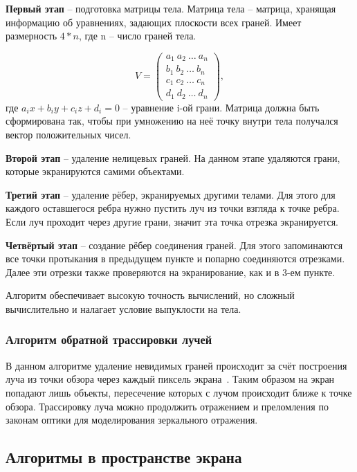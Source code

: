\textbf{Первый этап} -- подготовка матрицы тела. Матрица тела -- матрица, хранящая информацию об уравнениях, задающих плоскости всех граней. Имеет размерность $4*n$, где n -- число граней тела.

\begin{equation}
	\label{eq:body_matrix}
	V = \begin{pmatrix}
		a_1\ a_2\ \dots\ a_n \\
		b_1\ b_2\ \dots\ b_n \\
		c_1\ c_2\ \dots\ c_n \\
		d_1\ d_2\ \dots\ d_n 
	\end{pmatrix},
\end{equation}
где $ a_ix + b_iy + c_iz + d_i = 0 $ -- уравнение i-ой грани. Матрица должна быть сформирована так, чтобы при умножению на неё точку внутри тела получался вектор положительных чисел.

\textbf{Второй этап} -- удаление нелицевых граней. На данном этапе удаляются грани, которые экранируются самими объектами.

\textbf{Третий этап} -- удаление рёбер, экранируемых другими телами. Для этого для каждого оставшегося ребра нужно пустить луч из точки взгляда к точке ребра. Если луч проходит через другие грани, значит эта точка отрезка экранируется. 

\textbf{Четвёртый этап} -- создание рёбер соединения граней. Для этого запоминаются все точки протыкания в предыдущем пункте и попарно соединяются отрезками. Далее эти отрезки также проверяются на экранирование, как и в 3-ем пункте.

Алгоритм обеспечивает высокую точность вычислений, но сложный вычислительно и налагает условие выпуклости на тела.

\subsubsection{Алгоритм обратной трассировки лучей}
В данном алгоритме удаление невидимых граней происходит за счёт построения луча из точки обзора через каждый пиксель экрана~\cite{gabriella}. Таким образом на экран попадают лишь объекты, пересечение которых с лучом происходит ближе к точке обзора. Трассировку луча можно продолжить отражением и преломления по законам оптики для моделирования зеркального отражения.

\subsection*{Алгоритмы в пространстве экрана}
